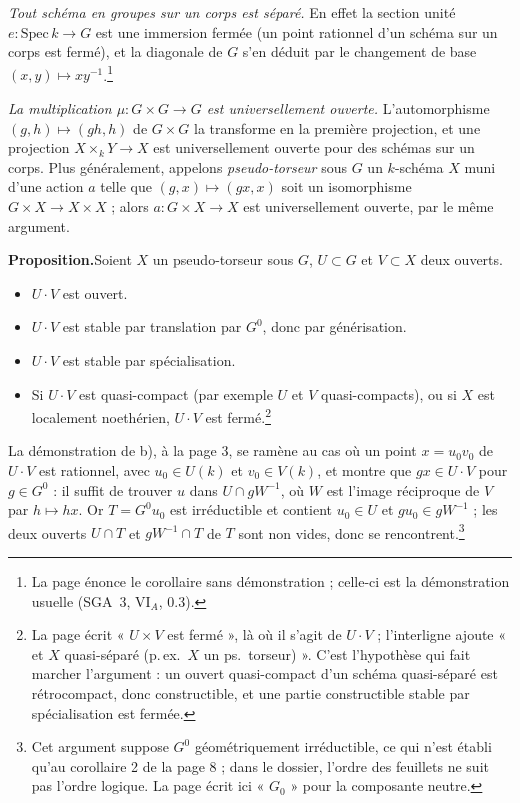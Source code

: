 \documentclass[11pt,a4paper]{article}
\begin{document}
\emph{Tout schéma en groupes sur un corps est séparé.} En effet la section
unité $e \colon \mathrm{Spec}\, k \to G$ est une immersion fermée (un point
rationnel d'un schéma sur un corps est fermé), et la diagonale de $G$ s'en
déduit par le changement de base $(x, y) \mapsto x y^{-1}$.\footnote{La page
énonce le corollaire sans démonstration ; celle-ci est la démonstration
usuelle (SGA~3, VI$_{A}$, 0.3).}

\emph{La multiplication $\mu \colon G \times G \to G$ est universellement
ouverte.} L'automorphisme $(g, h) \mapsto (gh, h)$ de $G \times G$ la
transforme en la première projection, et une projection
$X \times_{k} Y \to X$ est universellement ouverte pour des schémas sur un
corps. Plus généralement, appelons \emph{pseudo-torseur} sous $G$ un
$k$-schéma $X$ muni d'une action $a$ telle que
$(g, x) \mapsto (gx, x)$ soit un isomorphisme $G \times X \to X \times X$ ;
alors $a \colon G \times X \to X$ est universellement ouverte, par le même
argument.

\textbf{Proposition.}\quad Soient $X$ un pseudo-torseur sous $G$, $U \subset G$ et $V \subset X$ deux
ouverts.
\begin{itemize}
\item[a)] $U \cdot V$ est ouvert.
\item[b)] $U \cdot V$ est stable par translation par $G^{0}$, donc par
générisation.
\item[c)] $U \cdot V$ est stable par spécialisation.
\item[c')] Si $U \cdot V$ est quasi-compact (par exemple $U$ et $V$
quasi-compacts), ou si $X$ est localement noethérien, $U \cdot V$ est
fermé.\footnote{La page écrit « $U \times V$ est fermé », là où il s'agit de
$U \cdot V$ ; l'interligne ajoute « et $X$ quasi-séparé (p.\,ex.\ $X$ un
ps.\ torseur) ». C'est l'hypothèse qui fait marcher l'argument : un ouvert
quasi-compact d'un schéma quasi-séparé est rétrocompact, donc constructible,
et une partie constructible stable par spécialisation est fermée.}
\end{itemize}

La démonstration de b), à la page 3, se ramène au cas où un point
$x = u_{0} v_{0}$ de $U \cdot V$ est rationnel, avec $u_{0} \in U(k)$ et
$v_{0} \in V(k)$, et montre que $g x \in U \cdot V$ pour $g \in G^{0}$ : il
suffit de trouver $u$ dans $U \cap g W^{-1}$, où $W$ est l'image réciproque
de $V$ par $h \mapsto h x$. Or $T = G^{0} u_{0}$ est irréductible et contient
$u_{0} \in U$ et $g u_{0} \in g W^{-1}$ ; les deux ouverts $U \cap T$ et
$g W^{-1} \cap T$ de $T$ sont non vides, donc se rencontrent.\footnote{Cet
argument suppose $G^{0}$ géométriquement irréductible, ce qui n'est établi
qu'au corollaire 2 de la page 8 ; dans le dossier, l'ordre des feuillets ne
suit pas l'ordre logique. La page écrit ici « $G_{0}$ » pour la composante
neutre.}
\end{document}
